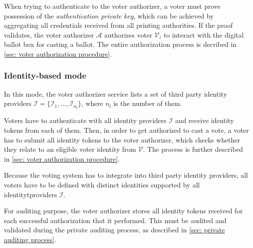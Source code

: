 When trying to authenticate to the voter authorizer, a voter must prove possession of the \textit{authentication private key}, which can be achieved by aggregating all credentials received from all printing authorities. If the proof validates, the voter authorizer $\mathcal{A}$ authorizes voter $\mathcal{V}_i$ to interact with the digital ballot box for casting a ballot. The entire authorization process is decribed in \cref{sec: voter authorization procedure}.


\subsubsection{Identity-based mode} \label{sec: identity-based mode}
In this mode, the voter authorizer service lists a set of third party identity providers $\boldsymbol{\mathcal{I}} = \{ \mathcal{I}_1, ..., \mathcal{I}_{n_\mathrm{i}} \}$, where $n_\mathrm{i}$ is the number of them.

Voters have to authenticate with all identity providers $\boldsymbol{\mathcal{I}}$ and receive identity tokens from each of them. Then, in order to get authorized to cast a vote, a voter has to submit all identity tokens to the voter authorizer, which checks whether they relate to an eligible voter identity from $\boldsymbol{\mathcal{V}}$. The process is further described in \cref{sec: voter authorization procedure}.

Because the voting system has to integrate into third party identity providers, all voters have to be defined with distinct identities supported by all identitytproviders $\boldsymbol{\mathcal{I}}$.

For auditing purpose, the voter authorizer stores all identity tokens received for each successful authorization that it performed. This must be audited and validated during the private auditing process, as described in \cref{sec: private auditing process}.
